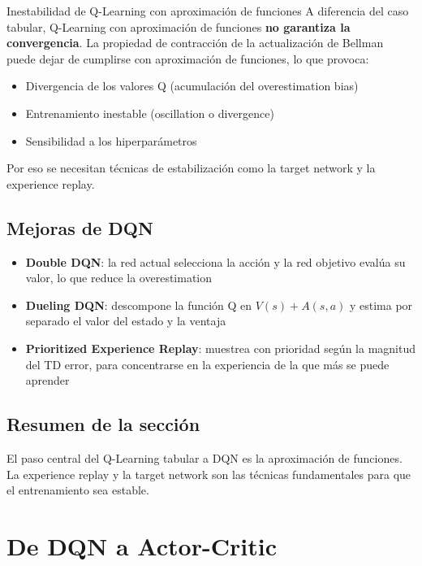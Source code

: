 \documentclass[a4paper]{article}
\begin{document}
\begin{warningbox}{Inestabilidad de Q-Learning con aproximación de funciones}
A diferencia del caso tabular, Q-Learning con aproximación de funciones \textbf{no garantiza la convergencia}. La propiedad de contracción de la actualización de Bellman puede dejar de cumplirse con aproximación de funciones, lo que provoca:
\begin{itemize}
    \item Divergencia de los valores Q (acumulación del overestimation bias)
    \item Entrenamiento inestable (oscillation o divergence)
    \item Sensibilidad a los hiperparámetros
\end{itemize}
Por eso se necesitan técnicas de estabilización como la target network y la experience replay.
\end{warningbox}

\subsection{Mejoras de DQN}

\begin{itemize}
    \item \textbf{Double DQN}: la red actual selecciona la acción y la red objetivo evalúa su valor, lo que reduce la overestimation
    \item \textbf{Dueling DQN}: descompone la función Q en $V(s) + A(s, a)$ y estima por separado el valor del estado y la ventaja
    \item \textbf{Prioritized Experience Replay}: muestrea con prioridad según la magnitud del TD error, para concentrarse en la experiencia de la que más se puede aprender
\end{itemize}

\subsection{Resumen de la sección}

El paso central del Q-Learning tabular a DQN es la aproximación de funciones. La experience replay y la target network son las técnicas fundamentales para que el entrenamiento sea estable.

\section{De DQN a Actor-Critic}
\end{document}
